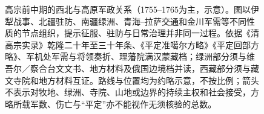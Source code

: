 \begin{figure}[htbp]
  \caption{高宗前中期的西北与高原军政关系（1755--1765为主，示意）。图以伊犁战事、北疆驻防、南疆绿洲、青海--拉萨交通和金川军需等不同性质的节点组织，提示征服、驻防与日常治理并非同一过程。依据《清高宗实录》乾隆二十年至三十年条、《平定准噶尔方略》《平定回部方略》、军机处军需与将领奏折、理藩院满汉蒙藏档；绿洲部分须与维吾尔／察合台文文书、地方材料及俄国边境档并读，西藏部分须与藏文寺院和地方材料互证。路线与位置均为约略示意，不按比例；箭头不表示对牧地、绿洲、寺院、山地或边界的持续主权和社会接受，方略所载军数、伤亡与“平定”亦不能视作无须核验的总数。}
  \label{fig:high-qing-frontier-ili-tibet}
\end{figure}
